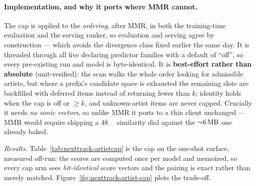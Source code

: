\documentclass[11pt]{article}
\begin{document}
\paragraph{Implementation, and why it ports where MMR cannot.} The cap is applied
to the \emph{ordering}, after MMR, in both the training-time evaluation and the
serving ranker, so evaluation and serving agree by construction --- which avoids the
divergence class fixed earlier the same day. It is threaded through all five
declaring predictor families with a default of ``off'', so every pre-existing run
and model is byte-identical. It is \textbf{best-effort rather than absolute}
(unit-verified): the scan walks the whole order looking for admissible artists, but
where a prefix's candidate space is exhausted the remaining slots are backfilled
with deferred items instead of returning fewer than $k$; identity holds when the cap
is off or $\ge k$, and unknown-artist items are never capped. Crucially it needs
\emph{no sonic vectors}, so unlike MMR it ports to a thin client unchanged --- MMR
would require shipping a \SI{48}{\mega\byte} similarity dial against the
${\sim}\SI{6}{\mega\byte}$ one already baked.

\emph{Results.} Table~\ref{tab:nexttrack-artistcap} is the cap on the one-shot
surface, measured off-run: the scores are computed once per model and memoized, so
every cap arm sees \emph{bit-identical} score vectors and the pairing is exact
rather than merely matched. Figure~\ref{fig:nexttrack-artist-cap} plots the
trade-off.
\end{document}
